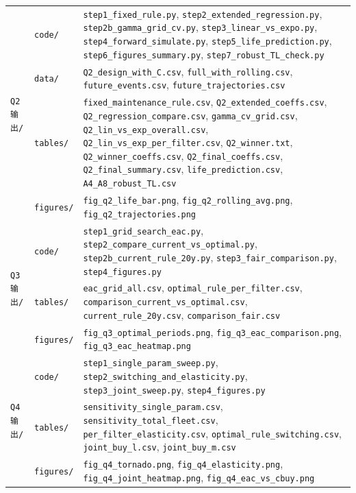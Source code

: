 \documentclass[12pt, a4paper, fontset=fandol]{ctexart}
\theoremstyle{definition}
\begin{document}
\begin{longtable}{p{}p{}p{}}
\multirow{4}{*}{\texttt{Q2输出/}}
  & \texttt{code/} &
    \texttt{step1\_fixed\_rule.py}, \texttt{step2\_extended\_regression.py}, \texttt{step2b\_gamma\_grid\_cv.py}, \texttt{step3\_linear\_vs\_expo.py}, \texttt{step4\_forward\_simulate.py}, \texttt{step5\_life\_prediction.py}, \texttt{step6\_figures\_summary.py}, \texttt{step7\_robust\_TL\_check.py} \\
  & \texttt{data/} &
    \texttt{Q2\_design\_with\_C.csv}, \texttt{full\_with\_rolling.csv}, \texttt{future\_events.csv}, \texttt{future\_trajectories.csv} \\
  & \texttt{tables/} &
    \texttt{fixed\_maintenance\_rule.csv}, \texttt{Q2\_extended\_coeffs.csv}, \texttt{Q2\_regression\_compare.csv}, \texttt{gamma\_cv\_grid.csv}, \texttt{Q2\_lin\_vs\_exp\_overall.csv}, \texttt{Q2\_lin\_vs\_exp\_per\_filter.csv}, \texttt{Q2\_winner.txt}, \texttt{Q2\_winner\_coeffs.csv}, \texttt{Q2\_final\_coeffs.csv}, \texttt{Q2\_final\_summary.csv}, \texttt{life\_prediction.csv}, \texttt{A4\_A8\_robust\_TL.csv} \\
  & \texttt{figures/} &
    \texttt{fig\_q2\_life\_bar.png}, \texttt{fig\_q2\_rolling\_avg.png}, \texttt{fig\_q2\_trajectories.png} \\
\midrule

\multirow{3}{*}{\texttt{Q3输出/}}
  & \texttt{code/} &
    \texttt{step1\_grid\_search\_eac.py}, \texttt{step2\_compare\_current\_vs\_optimal.py}, \texttt{step2b\_current\_rule\_20y.py}, \texttt{step3\_fair\_comparison.py}, \texttt{step4\_figures.py} \\
  & \texttt{tables/} &
    \texttt{eac\_grid\_all.csv}, \texttt{optimal\_rule\_per\_filter.csv}, \texttt{comparison\_current\_vs\_optimal.csv}, \texttt{current\_rule\_20y.csv}, \texttt{comparison\_fair.csv} \\
  & \texttt{figures/} &
    \texttt{fig\_q3\_optimal\_periods.png}, \texttt{fig\_q3\_eac\_comparison.png}, \texttt{fig\_q3\_eac\_heatmap.png} \\
\midrule

\multirow{3}{*}{\texttt{Q4输出/}}
  & \texttt{code/} &
    \texttt{step1\_single\_param\_sweep.py}, \texttt{step2\_switching\_and\_elasticity.py}, \texttt{step3\_joint\_sweep.py}, \texttt{step4\_figures.py} \\
  & \texttt{tables/} &
    \texttt{sensitivity\_single\_param.csv}, \texttt{sensitivity\_total\_fleet.csv}, \texttt{per\_filter\_elasticity.csv}, \texttt{optimal\_rule\_switching.csv}, \texttt{joint\_buy\_l.csv}, \texttt{joint\_buy\_m.csv} \\
  & \texttt{figures/} &
    \texttt{fig\_q4\_tornado.png}, \texttt{fig\_q4\_elasticity.png}, \texttt{fig\_q4\_joint\_heatmap.png}, \texttt{fig\_q4\_eac\_vs\_cbuy.png} \\

\end{longtable}
\endgroup
\end{document}
